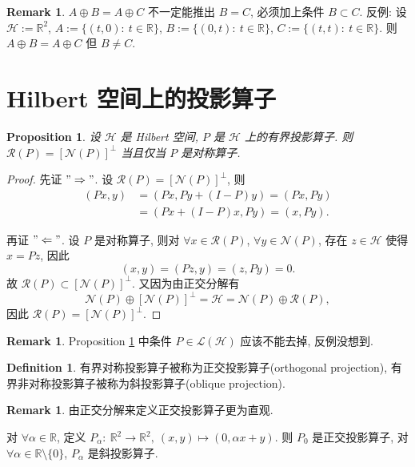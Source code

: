 \documentclass[a4paper,11pt]{article}
\newtheorem{proposition}[theorem]{Proposition}
\theoremstyle{definition}
\newtheorem{remark}[theorem]{Remark}
\newtheorem{definition}[theorem]{Definition}
\begin{document}
\begin{CJK*}{UTF8}{gbsn}
\begin{remark}
    $ A \oplus B = A \oplus C $ 不一定能推出 $ B = C $, 必须加上条件 $ B \subset C $.
    反例: 设 $ \mathcal{H} := \mathbb{R}^2 $, 
    $ A := \{ (t, 0) :\ t \in \mathbb{R} \} $,
    $ B := \{ (0, t) :\ t \in \mathbb{R} \} $,
    $ C := \{ (t, t) :\ t \in \mathbb{R} \} $.
    则 $ A \oplus B = A \oplus C $ 但 $ B \neq C $.
\end{remark}

\section{Hilbert 空间上的投影算子}

\begin{proposition} \label{5}
    设 $ \mathcal{H} $ 是 Hilbert 空间, $ P $ 是 $ \mathcal{H} $ 上的有界投影算子. 
    则 $ \mathcal{R}(P) = [\mathcal{N}(P)]^\bot $ 当且仅当 $ P $ 是对称算子.
\end{proposition}

\begin{proof}
    先证 $ "\Rightarrow" $. 设 $ \mathcal{R}(P) = [\mathcal{N}(P)]^\bot $, 则
    \begin{align*}
        (P x, y) &= (Px, Py + (I - P)y) 
                 = (Px, Py)  \\
                 &= (Px + (I - P)x, Py)
                 = (x, Py).
    \end{align*}
    
    再证 $ "\Leftarrow" $. 设 $ P $ 是对称算子, 则对 $ \forall x \in \mathcal{R}(P) $, $ \forall y \in \mathcal{N}(P) $,
    存在 $ z \in \mathcal{H} $ 使得 $ x = Pz $, 因此
    $$
        (x, y) = (Pz, y) = (z, Py) = 0.
    $$
    故 $ \mathcal{R}(P) \subset [\mathcal{N}(P)]^\bot $.
    又因为由正交分解有
    $$
        \mathcal{N}(P) \oplus [\mathcal{N}(P)]^\bot = \mathcal{H} = \mathcal{N}(P) \oplus \mathcal{R}(P),
    $$
    因此 $ \mathcal{R}(P) = [\mathcal{N}(P)]^\bot $.
\end{proof}

\begin{remark}
    Proposition \ref{5} 中条件 $ P \in \mathscr{L}(\mathcal{H}) $ 应该不能去掉, 反例没想到.
\end{remark}

\begin{definition}
    有界对称投影算子被称为正交投影算子(orthogonal projection),
    有界非对称投影算子被称为斜投影算子(oblique projection).
\end{definition}

\begin{remark}
    由正交分解来定义正交投影算子更为直观.

    对 $ \forall \alpha \in \mathbb{R} $,
    定义 $ P_\alpha :\ \mathbb{R}^2 \to \mathbb{R}^2,\ (x, y) \mapsto (0, \alpha x + y) $.
    则 $ P_0 $ 是正交投影算子, 对 $ \forall \alpha \in \mathbb{R} \setminus \{0\} $, $ P_\alpha $ 是斜投影算子.
\end{remark}

\end{CJK*}
\end{document}
